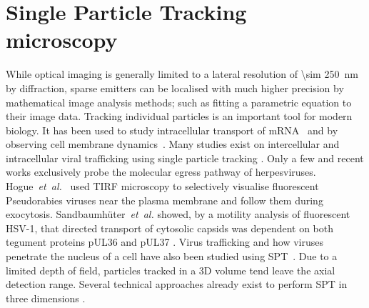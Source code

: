 \section{Single Particle Tracking microscopy}

While optical imaging is generally limited to a lateral resolution of \SI{\sim 250}{\nano\metre} by diffraction, sparse emitters can be localised with much higher precision by mathematical image analysis methods; such as fitting a parametric equation to their image data.
Tracking individual particles is an important tool for modern biology.
It has been used to study intracellular transport of mRNA~\cite{Spille2015a} and by observing cell membrane dynamics~\cite{Cognet2014}.
Many studies exist on intercellular and intracellular viral trafficking
using single particle tracking \cite{(reviewed in [43])}.
Only a few and recent works exclusively probe the molecular egress pathway of herpesviruses.
Hogue~\emph{et~al.}~\cite{[16]} used \gls{TIRF} microscopy to selectively visualise fluorescent Pseudorabies viruses near the plasma membrane and follow them during exocytosis.
Sandbaumhüter~\emph{et~al.} showed, by a motility analysis of fluorescent \gls{HSV}-1, that directed transport of cytosolic capsids was dependent on both tegument proteins pUL36 and pUL37 \cite{[44]}.
Virus trafficking and how viruses penetrate the nucleus of a cell have also been studied using \gls{SPT}~\cite{Brandenburg2007}.
Due to a limited depth of field, particles tracked in a \gls{3D} volume tend leave the axial detection range.
Several technical approaches already exist to perform \gls{SPT} in three dimensions \cite{[46-49]}.

